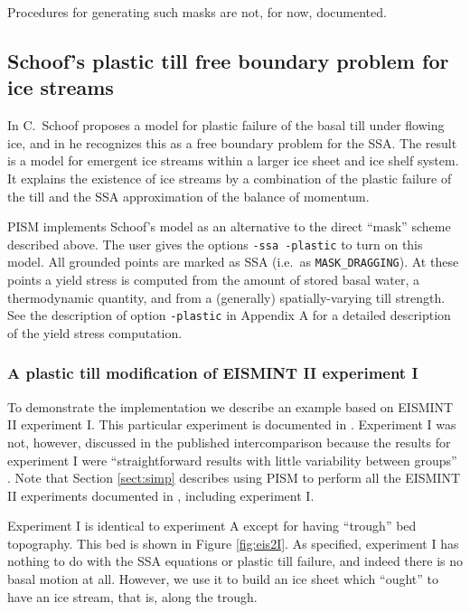 \documentclass[11pt,final]{amsart}
\begin{document}
Procedures for generating such masks are not, for now, documented.


\subsection{Schoof's plastic till free boundary problem for ice streams} \label{subsect:plastic}    In \cite{SchoofTill} C.~Schoof proposes a model for plastic failure of the basal till under flowing ice, and in \cite{SchoofStream} he recognizes this as a free boundary problem for the SSA.  The result is a model for emergent ice streams within a larger ice sheet and ice shelf system.  It explains the existence of ice streams by a combination of the plastic failure of the till and the SSA approximation of the balance of momentum.

PISM implements Schoof's model as an alternative to the direct ``mask'' scheme described above.  The user gives the options \verb|-ssa -plastic| to turn on this model.  All grounded points are marked as SSA (i.e.~as \verb|MASK_DRAGGING|).  At these points a yield stress is computed from the amount of stored basal water, a thermodynamic quantity, and from a (generally) spatially-varying till strength.  See the description of option \verb|-plastic| in Appendix A for a detailed description of the yield stress computation.

\subsubsection*{A plastic till modification of EISMINT II experiment I}  To demonstrate the implementation we describe an example based on EISMINT II experiment I.  This particular experiment is documented in \cite{EISIIdescribe}.  Experiment I was not, however, discussed in the published intercomparison because the results for experiment I were ``straightforward results with little variability between groups'' \cite{EISMINT00}.  Note that Section \ref{sect:simp} describes using PISM to perform all the EISMINT II experiments documented in \cite{EISIIdescribe}, including experiment I.

Experiment I is identical to experiment A except for having ``trough'' bed topography.  This bed is shown in Figure \ref{fig:eis2I}.  As specified, experiment I has nothing to do with the SSA equations or plastic till failure, and indeed there is no basal motion at all.  However, we use it to build an ice sheet which ``ought'' to have an ice stream, that is, along the trough.
\end{document}

